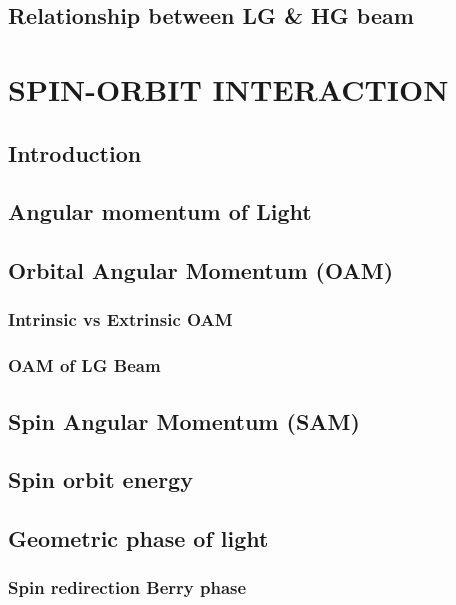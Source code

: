 \documentclass[11pt,a4paper]{article}
\numberwithin{equation}{section}
\begin{document}
\subsection{Relationship between LG \& HG beam}
\cite{beijers 93}



\clearpage
\section{SPIN-ORBIT INTERACTION}
\subsection{Introduction}

\subsection{Angular momentum of Light}

\subsection{Orbital Angular Momentum (OAM)}
\subsubsection{Intrinsic vs Extrinsic OAM}

\subsubsection{OAM of LG Beam}

\subsection{Spin Angular Momentum (SAM)}

\subsection{Spin orbit energy}

\subsection{Geometric phase of light}
\subsubsection{Spin redirection Berry phase}
\end{document}
